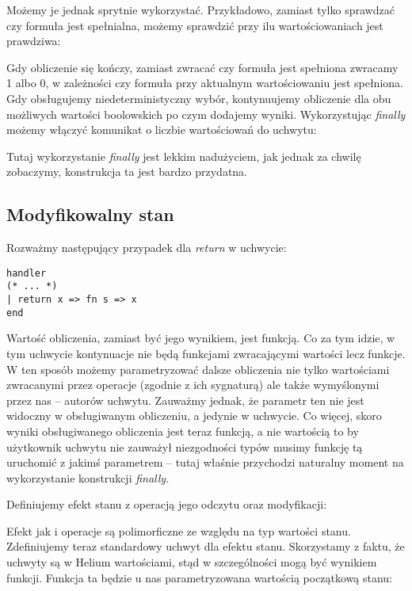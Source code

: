 Możemy je jednak sprytnie wykorzystać. Przykładowo, zamiast tylko sprawdzać czy formuła jest spełnialna, możemy sprawdzić przy ilu wartościowaniach jest prawdziwa:



Gdy obliczenie się kończy, zamiast zwracać czy formuła jest spełniona zwracamy 1 albo 0, w zależności czy formuła przy aktualnym wartościowaniu jest spełniona. Gdy obsługujemy niedeterministyczny wybór, kontynuujemy obliczenie dla obu możliwych wartości boolowskich po czym dodajemy wyniki. Wykorzystując \textit{finally} możemy włączyć komunikat o liczbie wartościowań do uchwytu:



Tutaj wykorzystanie \textit{finally} jest lekkim nadużyciem, jak jednak za chwilę zobaczymy, konstrukcja ta jest bardzo przydatna.

\subsection{Modyfikowalny stan}

Rozważmy następujący przypadek dla \textit{return} w uchwycie:

\begin{lstlisting}
handler
(* ... *)
| return x => fn s => x
end
\end{lstlisting}

Wartość obliczenia, zamiast być jego wynikiem, jest funkcją. Co za tym idzie, w tym uchwycie kontynuacje nie będą funkcjami zwracającymi wartości lecz funkcje. W ten sposób możemy parametryzować dalsze obliczenia nie tylko wartościami zwracanymi przez operacje (zgodnie z ich sygnaturą) ale także wymyślonymi przez nas -- autorów uchwytu. Zauważmy jednak, że parametr ten nie jest widoczny w obsługiwanym obliczeniu, a jedynie w uchwycie. Co więcej, skoro wyniki obsługiwanego obliczenia jest teraz funkcją, a nie wartością to by użytkownik uchwytu nie zauważył niezgodności typów musimy funkcję tą uruchomić z jakimś parametrem -- tutaj właśnie przychodzi naturalny moment na wykorzystanie konstrukcji \textit{finally}.

Definiujemy efekt stanu z operacją jego odczytu oraz modyfikacji:



Efekt jak i operacje są polimorficzne ze względu na typ wartości stanu. Zdefiniujemy teraz standardowy uchwyt dla efektu stanu. Skorzystamy z faktu, że uchwyty są w Helium wartościami, stąd w szczególności mogą być wynikiem funkcji. Funkcja ta będzie u nas parametryzowana wartością początkową stanu:

